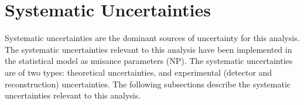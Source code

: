 \documentclass[NOTE, atlasdraft=true, texlive=2017, UKenglish]{\ATLASLATEXPATH atlasdoc}
\begin{document}


\clearpage
\section{Systematic Uncertainties}
\label{sec:systematics}

Systematic uncertainties are the dominant sources of uncertainty for this analysis. The systematic uncertainties relevant to this analysis have been implemented in the statistical model as nuisance parameters (NP). The systematic uncertainties are of two types: theoretical uncertainties, and experimental (detector and reconstruction) uncertainties. The following subsections describe the systematic uncertainties relevant to this analysis.
\end{document}
